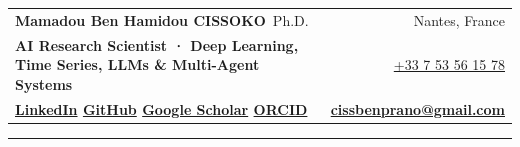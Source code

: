 \newcommand{\cvjob}[4]{%
  \noindent\textbf{#1}\hfill{\small\bfseries\textcolor{accent}{#2}}\par
  \noindent{\small\itshape\textcolor{muted}{#3}}\hfill{\small\itshape\textcolor{muted}{#4}}\par}
\newcommand{\cvproject}[3]{%
  \noindent\textbf{#1}\hfill{\small\bfseries\textcolor{accent}{#2}}\par
  \noindent{\footnotesize\textcolor{muted}{#3}}\par}
\newcommand{\cvstack}[1]{\noindent{\footnotesize\textcolor{muted}{\textbf{Stack:}\,#1}}\par\vspace{4pt}}
\newcommand{\cvpub}[3]{%
  \noindent\hangindent=9mm\hangafter=1\makebox[9mm][l]{\small\bfseries\textcolor{accent}{[#1]}}{\small #2\if\relax\detokenize{#3}\relax\else{} \href{#3}{\textcolor{accent}{\textbf{[Link]}}}\fi}\par\vspace{2pt}}
\newcommand{\cvdegree}[3]{%
  \noindent{\small\bfseries #1}\hfill{\small\bfseries\textcolor{accent}{#2}}\par
  \noindent{\small\itshape\textcolor{muted}{#3}}\par\vspace{3pt}}
\newcommand{\cvref}[3]{%
  \begin{minipage}[t]{0.315\linewidth}\raggedright\footnotesize
    \textbf{\small #1}\\ \textcolor{muted}{#2}\\ \href{mailto:#3}{\textcolor{accent}{#3}}
  \end{minipage}}
\newcommand{\cvskill}[2]{\textbf{#1} & #2\\[1.5pt]}


\begin{tabularx}{\linewidth}{@{}X r@{}}
  {\LARGE\bfseries Mamadou Ben Hamidou {\color{accent}CISSOKO}}\,{\large\color{muted} Ph.D.} &
  {\small Nantes, France}\\[2pt]
  {\color{accent}\bfseries\small AI Research Scientist · Deep Learning, Time Series, LLMs \& Multi-Agent Systems} &
  {\small \href{tel:+33753561578}{+33 7 53 56 15 78}}\\[1pt]
  {\small\color{accent}\bfseries
    \href{https://www.linkedin.com/in/mamadou-ben-hamidou-cissoko-2171b0166/}{LinkedIn} \quad
    \href{https://github.com/benprano}{GitHub} \quad
    \href{https://scholar.google.com/citations?user=k_2SuOkAAAAJ\&hl=en\&oi=sra}{Google Scholar} \quad
    \href{https://orcid.org/0009-0002-1840-9325}{ORCID}} &
  {\small\bfseries \href{mailto:cissbenprano@gmail.com}{cissbenprano@gmail.com}}
\end{tabularx}
{\color{accent}\rule{\linewidth}{1.2pt}}

